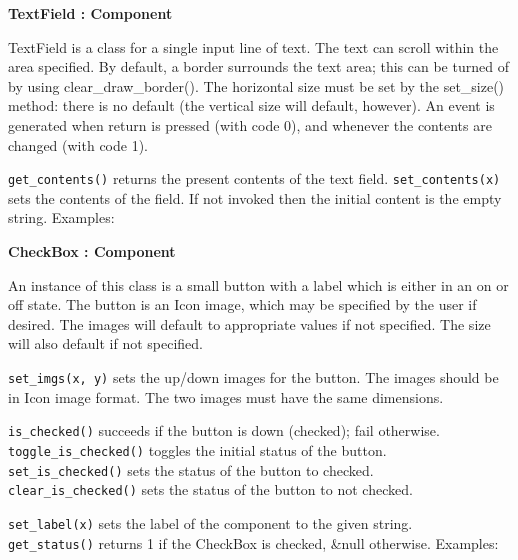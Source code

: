 {\ttfamily\bfseries
{}TextField : Component}

TextField is a class for a single input line of text. The text can
scroll within the area specified. By default, a border surrounds the
text area; this can be turned of by using clear\_draw\_border(). The
horizontal size must be set by the set\_size() method: there is no
default (the vertical size will default, however). An event is
generated when return is pressed (with code 0), and whenever the
contents are changed (with code 1).

\texttt{get\_contents()} returns the present contents of the text field.
\texttt{set\_contents(x)} sets the contents of the field. If not invoked then
the initial content is the empty string. Examples:


{\ttfamily\bfseries
{}CheckBox : Component}

An instance of this class is a small button with a label which is either
in an on or off state. The button is an Icon image, which may be
specified by the user if desired. The images will default to
appropriate values if not specified. The size will also default if not
specified.

\texttt{set\_imgs(x, y)} sets the up/down images for the button. The images
should be in Icon image format. The two images must have the same
dimensions.

\texttt{is\_checked()} succeeds if the button is down (checked); fail
otherwise.\\
\texttt{toggle\_is\_checked()} toggles the initial status of the button.\\
\texttt{set\_is\_checked()} sets the status of the button to checked.\\
\texttt{clear\_is\_checked()} sets the status of the button to not checked.

\texttt{set\_label(x)} sets the label of the component to the given
string.\\
\texttt{get\_status()} returns 1 if the CheckBox is checked, \&null otherwise.
Examples:

